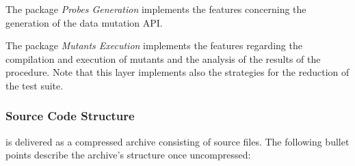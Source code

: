The package \textit{Probes Generation} implements the features concerning the generation of the data mutation API.

The package \textit{Mutants Execution} implements the features regarding the compilation and execution of mutants and the analysis of the results of the \dama procedure. Note that this layer implements also the strategies for the reduction of the test suite.

\subsubsection{Source Code Structure}


\dama is delivered as a compressed archive consisting of source files.
The following bullet points describe the archive's structure once uncompressed:

